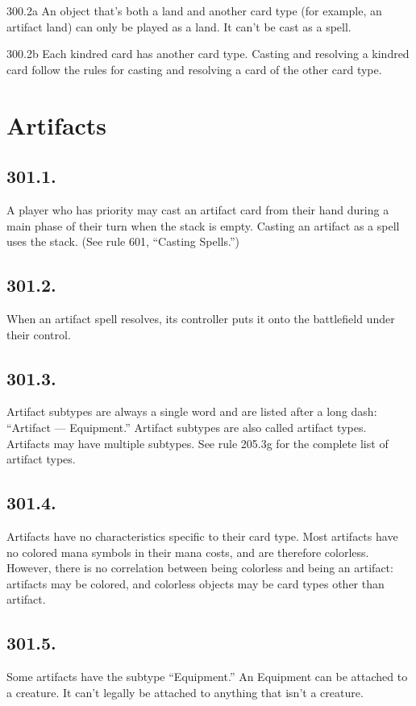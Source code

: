 300.2a An object that’s both a land and another card type (for example, an artifact land) can only be played as a land. It can’t be cast as a spell.

300.2b Each kindred card has another card type. Casting and resolving a kindred card follow the rules for casting and resolving a card of the other card type.

\section{Artifacts}
\subsection*{301.1.}
A player who has priority may cast an artifact card from their hand during a main phase of their turn when the stack is empty. Casting an artifact as a spell uses the stack. (See rule 601, “Casting Spells.”)

\subsection*{301.2.}
When an artifact spell resolves, its controller puts it onto the battlefield under their control.

\subsection*{301.3.}
Artifact subtypes are always a single word and are listed after a long dash: “Artifact — Equipment.” Artifact subtypes are also called artifact types. Artifacts may have multiple subtypes. See rule 205.3g for the complete list of artifact types.

\subsection*{301.4.}
Artifacts have no characteristics specific to their card type. Most artifacts have no colored mana symbols in their mana costs, and are therefore colorless. However, there is no correlation between being colorless and being an artifact: artifacts may be colored, and colorless objects may be card types other than artifact.

\subsection*{301.5.}
Some artifacts have the subtype “Equipment.” An Equipment can be attached to a creature. It can’t legally be attached to anything that isn’t a creature.

